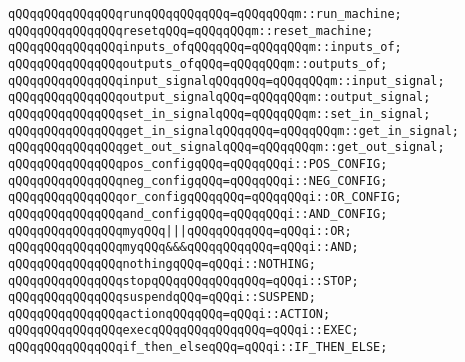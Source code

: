 \newline
\verb|qQQqqQQqqQQqqQQqrunqQQqqQQqqQQq=qQQqqQQqm::run_machine;|\newline
\verb|qQQqqQQqqQQqqQQqresetqQQq=qQQqqQQqm::reset_machine;|\newline
\newline
\verb|qQQqqQQqqQQqqQQqinputs_ofqQQqqQQq=qQQqqQQqm::inputs_of;|\newline
\verb|qQQqqQQqqQQqqQQqoutputs_ofqQQq=qQQqqQQqm::outputs_of;|\newline
\newline
\verb|qQQqqQQqqQQqqQQqinput_signalqQQqqQQq=qQQqqQQqm::input_signal;|\newline
\verb|qQQqqQQqqQQqqQQqoutput_signalqQQq=qQQqqQQqm::output_signal;|\newline
\verb|qQQqqQQqqQQqqQQqset_in_signalqQQq=qQQqqQQqm::set_in_signal;|\newline
\newline
\verb|qQQqqQQqqQQqqQQqget_in_signalqQQqqQQq=qQQqqQQqm::get_in_signal;|\newline
\verb|qQQqqQQqqQQqqQQqget_out_signalqQQq=qQQqqQQqm::get_out_signal;|\newline
\newline
\verb|qQQqqQQqqQQqqQQqpos_configqQQq=qQQqqQQqi::POS_CONFIG;|\newline
\verb|qQQqqQQqqQQqqQQqneg_configqQQq=qQQqqQQqi::NEG_CONFIG;|\newline
\newline
\verb|qQQqqQQqqQQqqQQqor_configqQQqqQQq=qQQqqQQqi::OR_CONFIG;|\newline
\verb|qQQqqQQqqQQqqQQqand_configqQQq=qQQqqQQqi::AND_CONFIG;|\newline
\newline
\verb|qQQqqQQqqQQqqQQqmyqQQq|\verb#|||qQQqqQQqqQQq=qQQqi::OR;#\newline
\verb|qQQqqQQqqQQqqQQqmyqQQq&&&qQQqqQQqqQQq=qQQqi::AND;|\newline
\verb|qQQqqQQqqQQqqQQqnothingqQQq=qQQqi::NOTHING;|\newline
\verb|qQQqqQQqqQQqqQQqstopqQQqqQQqqQQqqQQq=qQQqi::STOP;|\newline
\verb|qQQqqQQqqQQqqQQqsuspendqQQq=qQQqi::SUSPEND;|\newline
\verb|qQQqqQQqqQQqqQQqactionqQQqqQQq=qQQqi::ACTION;|\newline
\verb|qQQqqQQqqQQqqQQqexecqQQqqQQqqQQqqQQq=qQQqi::EXEC;|\newline
\verb|qQQqqQQqqQQqqQQqif_then_elseqQQq=qQQqi::IF_THEN_ELSE;|\newline
